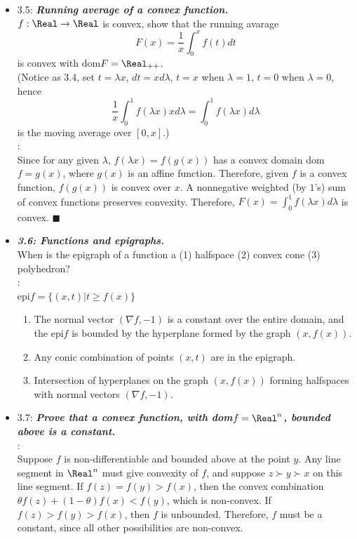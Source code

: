 \begin{itemize}
\item 3.5: {\bf\emph{Running average of a convex function.}} \\ $f: \Real \rightarrow \Real$ is
convex, show that the running avarage 
\begin{equation} 
   F(x) = \frac{1}{x} \int_0^x f(t) dt
\end{equation} 
is convex with dom$F=\Real_{++}$. \\ (Notice as 3.4, set $t= \lambda x$, $dt= x
d\lambda$, $t=x$ when $\lambda=1$, $t=0$ when $\lambda=0$, hence 
\begin{equation}
   \frac{1}{x}\int_0^1 f(\lambda x) xd\lambda = \int_0^1 f(\lambda x) d\lambda 
\end{equation} 
is the moving average over $[0, x]$.) \\ \Proof: \\ Since for any given $\lambda$, $f(\lambda
x)=f(g(x))$
has a convex domain dom$f=g(x)$, where $g(x)$ is an affine function.  Therefore, given $f$ is a
convex function, $f(g(x))$ is convex over $x$.  A nonnegative weighted (by $1$'s) sum of convex
functions preserves convexity.  Therefore, $F(x)= \int_0^1 f(\lambda x) d\lambda $ is convex.
$\blacksquare$

\item {\bf\emph{3.6: Functions and epigraphs.}} \\ 
When is the epigraph of a function a (1) halfspace (2) convex cone (3) polyhedron? \\
   
   \Proof: \\ epi$f= \{ (x,t) | t \ge f(x) \}$ 
\begin{enumerate} 
   \item The normal vector $(\nabla f,-1)$ is a constant over the entire domain, and the epi$f$ is
bounded by the hyperplane formed by the graph $(x,f(x))$.  
   \item Any conic combination of points $(x,t)$ are in the epigraph.  
   \item Intersection of hyperplanes on the graph $(x,f(x))$ forming halfspaces with normal vectors $(\nabla
f,-1)$.  
\end{enumerate}

\item 3.7: {\bf\emph{Prove that a convex function, with dom$f= \Real^n$, bounded above is a
constant.}} \\ \Proof: \\ Suppose $f$ is non-differentiable and bounded above at the point $y$.  Any
line segment in $\Real^n$ must give convexity of $f$, and suppose $z \succ y \succ x$ on this line
segment.  If $f(z)= f(y)> f(x)$, then the convex combination $\theta f(z) + (1-\theta) f(x) < f(y)$,
which is non-convex.  If $f(z)> f(y)> f(x)$, then $f$ is unbounded.  Therefore, $f$ must be a
constant, since all other possibilities are non-convex.


\end{itemize}
